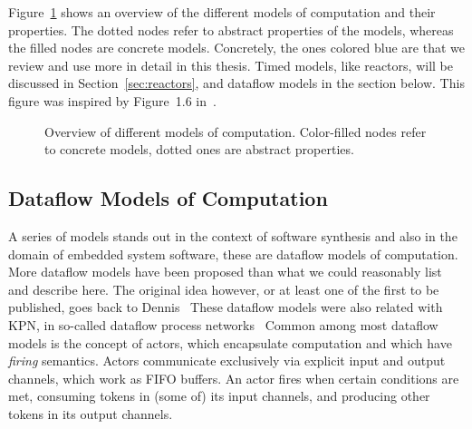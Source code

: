 Figure~\ref{fig:mocs_overview} shows an overview of the different models of computation and their properties.
The dotted nodes refer to abstract properties of the models, whereas the filled nodes are concrete models.
Concretely, the ones colored blue are that we review and use more in detail in this thesis.
Timed models, like reactors, will be discussed in Section~\ref{sec:reactors}, and dataflow models in the section below.
This figure was inspired by Figure~1.6 in~\cite{Ptolemaeus:14:SystemDesign}.

\begin{figure}[h]
	\centering
   \resizebox{1.00\textwidth}{!}{}
	\caption{Overview of different models of computation. Color-filled nodes refer to concrete models, dotted ones are abstract properties. }
	\label{fig:mocs_overview}
\end{figure}


\subsection{Dataflow Models of Computation}

A series of models stands out in the context of software synthesis and also in the domain of embedded system software, these are dataflow models of computation.
More dataflow models have been proposed than what we could reasonably list and describe here.
The original idea however, or at least one of the first to be published, goes back to Dennis~\cite{dennis1974first,dennis1986data}
These dataflow models were also related with \ac{KPN}, in so-called dataflow process networks~\cite{lee1995dataflow,lee_matsikoudis_semantics}
Common among most dataflow models is the concept of actors, which encapsulate computation and which have \emph{firing} semantics.
Actors communicate exclusively via explicit input and output channels, which work as \acs{FIFO} buffers.
An actor fires when certain conditions are met, consuming tokens in (some of) its input channels, and producing other tokens in its output channels.

